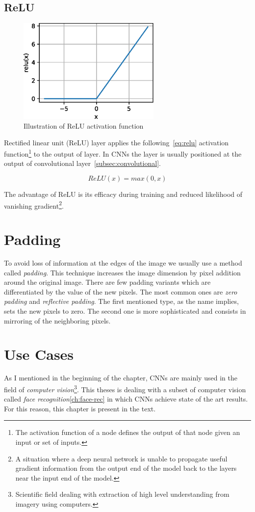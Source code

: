 \subsection{ReLU}\label{subsec:relu}

\begin{figure}
    \label{fig:relu}
    \includegraphics[width=7cm]{images/cnn/relu.eps}
    \caption{Illustration of ReLU activation function~\cite{ReLU}}
\end{figure}

Rectified linear unit (ReLU) layer applies the following~\ref{eq:relu} activation function\footnote{The activation
function of a node defines the output of that node given an input or set of inputs.} to the output of layer.
In CNNs the layer is usually positioned at the output of convolutional layer~\ref{subsec:convolutional}.

\begin{equation}\label{eq:relu}
    ReLU(x) = max(0,x)
\end{equation}

The advantage of ReLU is its efficacy during training and reduced likelihood of vanishing
gradient\footnote{\label{foot:vangrad}A situation where a deep neural network is unable to propagate useful gradient
information from the output end of the model back to the layers near the input end of the model.}.


\section{Padding}\label{sec:padding}
To avoid loss of information at the edges of the image we usually use a method called \textit{padding}.
This technique increases the image dimension by pixel addition around the original image.
There are few padding variants which are differentiated by the value of the new pixels.
The most common ones are \textit{zero padding} and \textit{reflective padding}.
The first mentioned type, as the name implies, sets the new pixels to zero.
The second one is more sophisticated and consists in mirroring of the neighboring pixels.

\section{Use Cases}\label{sec:use-cases}
As I mentioned in the beginning of the chapter, CNNs are mainly used in the field of
\textit{computer vision}\footnote{Scientific field dealing with extraction of high level understanding from imagery
using computers.}.
This theses is dealing with a subset of computer vision called \textit{face recognition}\ref{ch:face-rec} in which CNNs
achieve state of the art results.
For this reason, this chapter is present in the text.